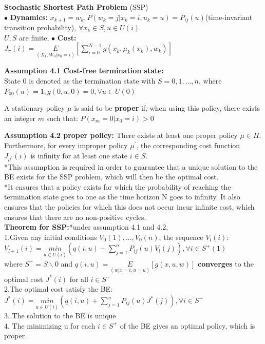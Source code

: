 \documentclass[10pt,landscape]{article}
\begin{document}
\begin{multicols*}{4}
\textbf{Stochastic Shortest Path Problem } (SSP)\\
$\bullet$ \textbf{Dynamics:} $x_{k+1}=w_k, P(w_k = j | x_k=i, u_k = u) = P_{ij}(u)$(time-invariant transition probability), $\forall x_k \in S, u \in U(i)$\\
$U, S$ are finite, $\bullet$ \textbf{Cost:}\\
$J_{\pi}(i) = \underset{(X_1, W_0| x_0 = i)}{E} [\sum_{i=0}^{N-1} g(x_k, \mu_k(x_k), w_k)]$

\textbf{Assumption 4.1 Cost-free termination state:}\\
State 0 is denoted as the termination state with $S = {0,1,...,n}$, where $P_{00}(u) = 1, g(0,u,0) = 0, \forall u \in U(0)$

A stationary policy $\mu$ is said to be \textbf{proper} if, when using this policy, there exists an integer $m$ such that:
$P(x_m = 0 | x_0=i) > 0$

\textbf{Assumption 4.2 proper policy:} There exists at least one proper policy $\mu \in \Pi$. Furthermore, for every improper policy $\mu ^{'}$, the corresponding cost function $J_{\mu ^{'}}(i)$ is infinity for at least one state $i \in S$.\\
*This assumption is required in order to guarantee that a unique solution to the
BE exists for the SSP problem, which will then be the optimal cost.\\
*It ensures that a policy exists for which the probability of reaching the
termination state goes to one as the time horizon N goes to infinity.
It also ensures that the policies for which this does not occur incur infinite
cost, which ensures that there are no non-positive cycles.
\\

\textbf{Theorem for SSP:}*under assumption 4.1 and 4.2,\\
1.Given any initial conditions $V_0(1),...,V_0(n)$, the sequence $V_l(i)$: $V_{l+1}(i) = \underset{u \in U(i)}{min} (q(i,u) + \sum_{j=1}^{n} P_{ij}(u)V_l(j)), \forall i \in S^{+}(1)$\\
where $S^{+} = S \backslash {0}$ and $q(i,u)=\underset{(w|x=i,u=u)}{E} [g(x,u,w)]$ \textbf{converges} to the optimal cost $J^{*}(i)$ for all $ i \in S^{+}$\\
2.The optimal cost satisfy the BE: 
$J^{*}(i) = \underset{u\in U(i)}{min} (q(i,u) + \sum_{j=1}^{n} P_{ij}(u) J^{*}(j)), \forall i \in S^{+}$\\
3. The solution to the BE is unique\\
4. The minimizing u for each $i \in S^{+}$ of the BE gives an optimal policy,
which is proper.



\end{multicols*}
\end{document}
